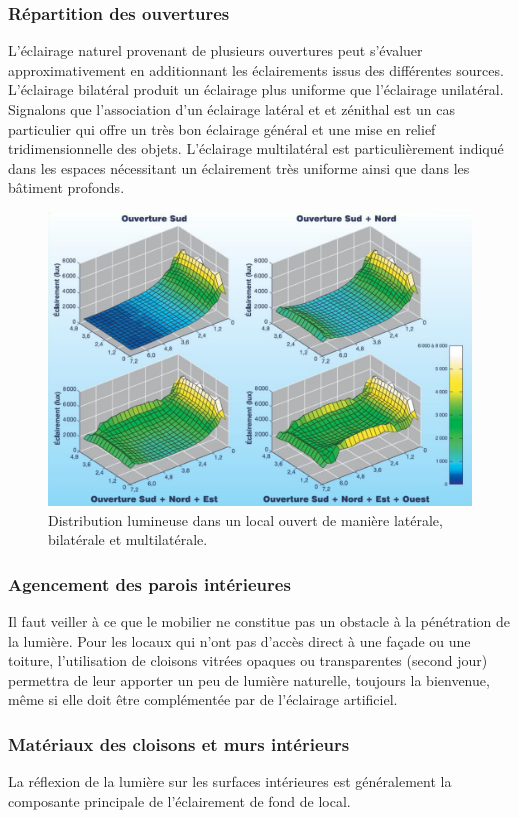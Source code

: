 \documentclass[11pt]{report}
\begin{document}
\subsubsection{Répartition des ouvertures}
L'éclairage naturel provenant de plusieurs ouvertures peut s'évaluer approximativement en additionnant les éclairements issus des différentes sources. L'éclairage bilatéral produit un éclairage plus uniforme que l'éclairage unilatéral. Signalons que l'association d'un éclairage latéral et et zénithal est un cas particulier qui offre un très bon éclairage général et une mise en relief tridimensionnelle des objets. L'éclairage multilatéral est particulièrement indiqué dans les espaces nécessitant un éclairement très uniforme ainsi que dans les bâtiment profonds.

\begin{figure}
\centering
\includegraphics[width=0.5\linewidth]{multi}
\caption{Distribution lumineuse dans un local ouvert de manière latérale, bilatérale et multilatérale.}
\end{figure}


\subsubsection{Agencement des parois intérieures}
Il faut veiller à ce que le mobilier ne constitue pas un obstacle à la pénétration de la lumière. Pour les locaux qui n'ont pas d'accès direct à une façade ou une toiture, l'utilisation de cloisons vitrées opaques ou transparentes (second jour) permettra de leur apporter un peu de lumière naturelle, toujours la bienvenue, même si elle doit être complémentée par de l'éclairage artificiel.



\subsubsection{Matériaux des cloisons et murs intérieurs}
La réflexion de la lumière sur les surfaces intérieures est généralement la composante principale de l'éclairement de fond de local.\\
\end{document}
